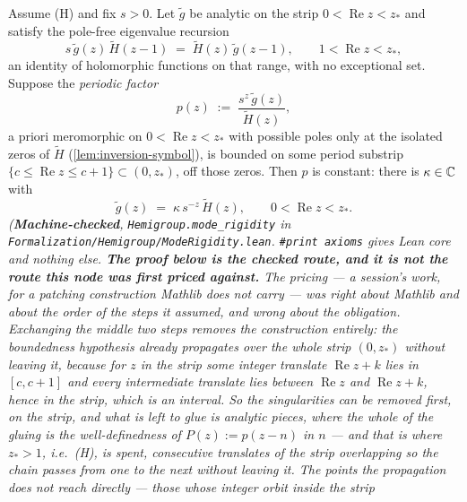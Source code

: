 \begin{lemma}\label{lem:mode-rigidity}
\leanok
Assume (H) and fix $s > 0$. Let $\tilde g$ be analytic on the strip $0 < \operatorname{Re} z < z_*$ and satisfy
the pole-free eigenvalue recursion
\[
s\,\tilde g(z)\,\tilde H(z-1) \;=\; \tilde H(z)\,\tilde g(z-1), \qquad 1 < \operatorname{Re} z < z_*,
\]
an identity of holomorphic functions on that range, with no exceptional set. Suppose the
\emph{periodic factor}
\[
p(z) \;:=\; \frac{s^z\,\tilde g(z)}{\tilde H(z)},
\]
a priori meromorphic on $0 < \operatorname{Re} z < z_*$ with possible poles only at the isolated zeros of
$\tilde H$ (\ref{lem:inversion-symbol}), is bounded on some period substrip
$\{c \le \operatorname{Re} z \le c+1\} \subset (0, z_*)$, off those zeros. Then $p$ is constant: there is
$\kappa \in \mathbb{C}$ with
\[
\tilde g(z) \;=\; \kappa\, s^{-z}\,\tilde H(z), \qquad 0 < \operatorname{Re} z < z_*.
\]
\statusT\quad\emph{(\textbf{Machine-checked}, \texttt{Hemigroup.mode\_rigidity} in
\texttt{Formalization/Hemigroup/ModeRigidity.lean}. \texttt{\#print axioms} gives Lean core and
nothing else.
\textbf{The proof below is the checked route, and it is not the route this node was first priced
against.} The pricing --- a session's work, for a patching construction Mathlib does not carry ---
was right about Mathlib and about the \emph{order} of the steps it assumed, and wrong about the
obligation. Exchanging the middle two steps removes the construction entirely: the boundedness
hypothesis already propagates over the whole strip $(0,z_*)$ \emph{without leaving it}, because for
$z$ in the strip some integer translate $\operatorname{Re} z + k$ lies in $[c,c+1]$ and every
intermediate translate lies between $\operatorname{Re} z$ and $\operatorname{Re} z + k$, hence in the
strip, which is an interval. So the singularities can be removed first, on the strip, and what is
left to glue is \emph{analytic} pieces, where the whole of the gluing is the well-definedness of
$P(z) := p(z-n)$ in $n$ --- and that is where $z_* > 1$, i.e.\ (H), is spent, consecutive
translates of the strip overlapping so the chain passes from one to the next without leaving it.
The points the propagation does not reach directly --- those whose integer orbit inside the strip
}
\end{lemma}
